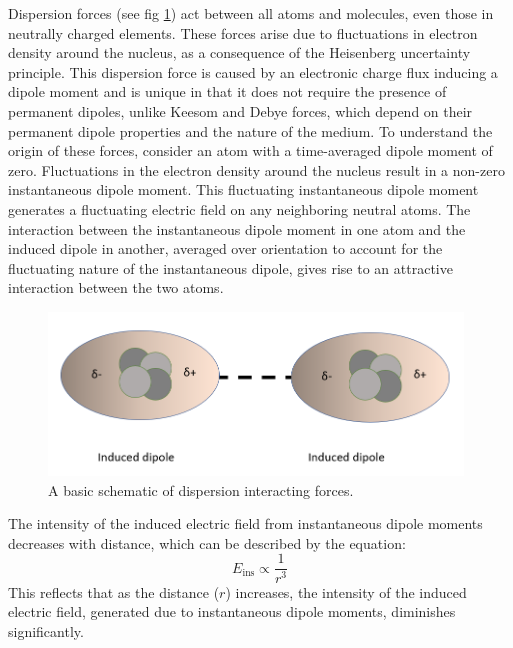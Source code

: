 Dispersion forces (see fig \ref{fig:dispy}) act between all atoms and molecules, even those in neutrally charged elements. These forces arise due to fluctuations in electron density around the nucleus, as a consequence of the Heisenberg uncertainty principle.\cite{heisenberg1927uber} \cite{griffiths2005} This dispersion force is caused by an electronic charge flux inducing a dipole moment and is unique in that it does not require the presence of permanent dipoles, unlike Keesom and Debye forces, which depend on their permanent dipole properties and the nature of the medium. \cite{IsGreenBook} To understand the origin of these forces, consider an atom with a time-averaged dipole moment of zero. Fluctuations in the electron density around the nucleus result in a non-zero instantaneous dipole moment. This fluctuating instantaneous dipole moment generates a fluctuating electric field on any neighboring neutral atoms. The interaction between the instantaneous dipole moment in one atom and the induced dipole in another, averaged over orientation to account for the fluctuating nature of the instantaneous dipole, gives rise to an attractive interaction between the two atoms. 

\begin{figure}[h!]     %
        \begin{center}
          \includegraphics[width=110mm]{chapter1/London.PNG}
\end{center}
\caption{A basic schematic of dispersion interacting forces.}
\label{fig:dispy}                 %
\end{figure}

The intensity of the induced electric field from instantaneous dipole moments decreases with distance, which can be described by the equation:
\begin{equation}
E_{\text{ins}} \propto \frac{1}{r^3}
\end{equation}
This reflects that as the distance (\(r\)) increases, the intensity of the induced electric field, generated due to instantaneous dipole moments, diminishes significantly.


